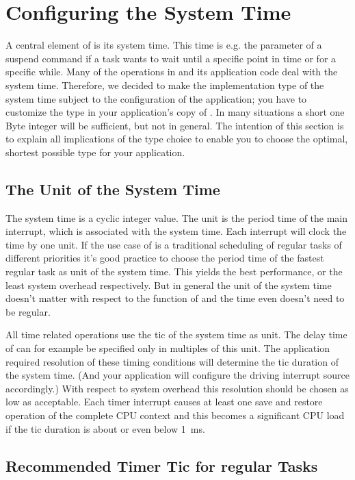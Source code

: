 \section{Configuring the System Time}
\label{secSystemTime}

A central element of \rtos{} is its system time. This time is e.g. the
parameter of a suspend command if a task wants to wait until a specific
point in time or for a specific while. Many of the
operations in \rtos{} and its application code deal with the system time.
Therefore, we decided to make the implementation type of the system time
subject to the configuration of the application; you have to customize the
type in your application's copy of . In many
situations a short one Byte integer will be sufficient, but not in
general. The intention of this section is to explain all implications of
the type choice to enable you to choose the optimal, shortest possible
type for your application.


\subsection{The Unit of the System Time}

The system time is a cyclic integer value. The unit is the period time of
the main interrupt, which is associated with the system time. Each
interrupt will clock the time by one unit. If the use case of \rtos{} is a
traditional scheduling of regular tasks of different priorities it's good
practice to choose the period time of the fastest regular task as unit of
the system time. This yields the best performance, or the least system
overhead respectively. But in general the unit of the system time doesn't
matter with respect to the function of \rtos{} and the time even doesn't
need to be regular.

All time related operations use the tic of the system time as unit. The
delay time of  can for example be specified only in
multiples of this unit. The application required resolution of these
timing conditions will determine the tic duration of the system time. (And
your application will configure the driving interrupt source accordingly.)
With respect to system overhead this resolution should be chosen as low as
acceptable. Each timer interrupt causes at least one save and restore
operation of the complete CPU context and this becomes a significant CPU
load if the tic duration is about or even below 1~ms.


\subsection{Recommended Timer Tic for regular Tasks}

